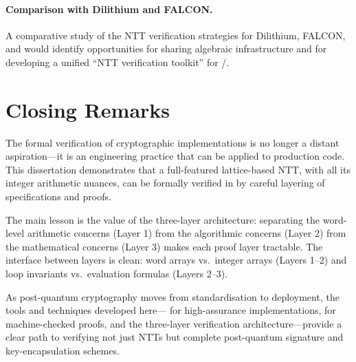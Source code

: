 \paragraph{Comparison with Dilithium and FALCON.}
A comparative study of the NTT verification strategies for Dilithium, FALCON,
and \haetae{} would identify opportunities for sharing algebraic infrastructure
and for developing a unified ``NTT verification toolkit'' for
\easycrypt{}/\jasmin{}.

\section{Closing Remarks}

The formal verification of cryptographic implementations is no longer a
distant aspiration---it is an engineering practice that can be applied to
production code.  This dissertation demonstrates that a full-featured
lattice-based NTT, with all its integer arithmetic nuances, can be formally
verified in \easycrypt{} by careful layering of specifications and proofs.

The main lesson is the value of the three-layer architecture: separating the
word-level arithmetic concerns (Layer 1) from the algorithmic concerns
(Layer 2) from the mathematical concerns (Layer 3) makes each proof layer
tractable.  The interface between layers is clean: word arrays vs.\ integer
arrays (Layers 1--2) and loop invariants vs.\ evaluation formulas (Layers 2--3).

As post-quantum cryptography moves from standardisation to deployment, the
tools and techniques developed here---\jasmin{} for high-assurance
implementations, \easycrypt{} for machine-checked proofs, and the three-layer
verification architecture---provide a clear path to verifying not just NTTs
but complete post-quantum signature and key-encapsulation schemes.
